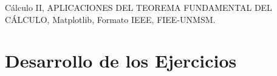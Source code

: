 \documentclass[conference]{IEEEtran}
\newcommand{\TemaSemana}{APLICACIONES DEL TEOREMA FUNDAMENTAL DEL CÁLCULO}
\begin{document}
	\begin{IEEEkeywords}
		Cálculo II, \TemaSemana, Matplotlib, Formato IEEE, FIEE-UNMSM.
	\end{IEEEkeywords}
	
	\section{Desarrollo de los Ejercicios}
	
	
	
	
	
\end{document}
